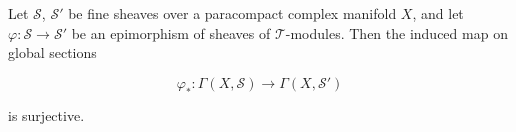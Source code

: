 Let $\mathcal{S}$, $\mathcal{S}'$ be fine sheaves over a paracompact complex manifold $X$, and let $\varphi: \mathcal{S} \rightarrow \mathcal{S}'$ be an epimorphism of sheaves of $\mathcal{T}$-modules. Then the induced map on global sections

$$\varphi_*: \Gamma(X, \mathcal{S}) \rightarrow \Gamma(X, \mathcal{S}')$$

is surjective.
